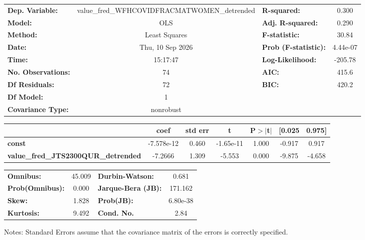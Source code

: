 \begin{center}
\begin{tabular}{lclc}
\toprule
\textbf{Dep. Variable:}                     & value\_fred\_WFHCOVIDFRACMATWOMEN\_detrended & \textbf{  R-squared:         } &     0.300   \\
\textbf{Model:}                             &                     OLS                      & \textbf{  Adj. R-squared:    } &     0.290   \\
\textbf{Method:}                            &                Least Squares                 & \textbf{  F-statistic:       } &     30.84   \\
\textbf{Date:}                              &               Thu, 10 Sep 2026               & \textbf{  Prob (F-statistic):} &  4.44e-07   \\
\textbf{Time:}                              &                   15:17:47                   & \textbf{  Log-Likelihood:    } &   -205.78   \\
\textbf{No. Observations:}                  &                        74                    & \textbf{  AIC:               } &     415.6   \\
\textbf{Df Residuals:}                      &                        72                    & \textbf{  BIC:               } &     420.2   \\
\textbf{Df Model:}                          &                         1                    & \textbf{                     } &             \\
\textbf{Covariance Type:}                   &                  nonrobust                   & \textbf{                     } &             \\
\bottomrule
\end{tabular}
\begin{tabular}{lcccccc}
                                            & \textbf{coef} & \textbf{std err} & \textbf{t} & \textbf{P$> |$t$|$} & \textbf{[0.025} & \textbf{0.975]}  \\
\midrule
\textbf{const}                              &   -7.578e-12  &        0.460     & -1.65e-11  &         1.000        &       -0.917    &        0.917     \\
\textbf{value\_fred\_JTS2300QUR\_detrended} &      -7.2666  &        1.309     &    -5.553  &         0.000        &       -9.875    &       -4.658     \\
\bottomrule
\end{tabular}
\begin{tabular}{lclc}
\textbf{Omnibus:}       & 45.009 & \textbf{  Durbin-Watson:     } &    0.681  \\
\textbf{Prob(Omnibus):} &  0.000 & \textbf{  Jarque-Bera (JB):  } &  171.162  \\
\textbf{Skew:}          &  1.828 & \textbf{  Prob(JB):          } & 6.80e-38  \\
\textbf{Kurtosis:}      &  9.492 & \textbf{  Cond. No.          } &     2.84  \\
\bottomrule
\end{tabular}
\end{center}

Notes: \newline
 [1] Standard Errors assume that the covariance matrix of the errors is correctly specified.